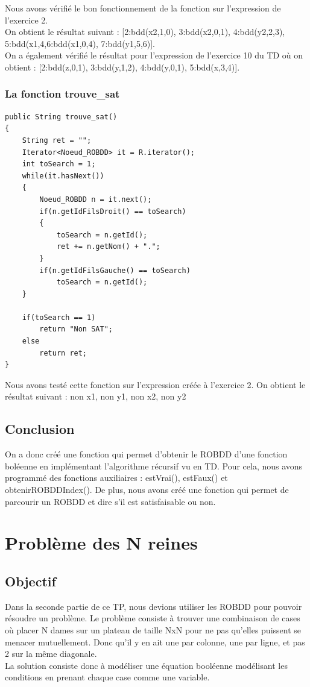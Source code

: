 \documentclass{article}
\begin{document}
Nous avons vérifié le bon fonctionnement de la fonction sur l'expression de l'exercice 2.\\
On obtient le résultat suivant : [2:bdd(x2,1,0), 3:bdd(x2,0,1), 4:bdd(y2,2,3), 5:bdd(x1,4,6:bdd(x1,0,4), 7:bdd(y1,5,6)].\\
On a également vérifié le résultat pour l'expression de l'exercice 10 du TD où on obtient : [2:bdd(z,0,1), 3:bdd(y,1,2), 4:bdd(y,0,1), 5:bdd(x,3,4)].\\
\subsubsection{La fonction trouve\_sat}
\begin{verbatim}
public String trouve_sat()
{
	String ret = "";
	Iterator<Noeud_ROBDD> it = R.iterator();
	int toSearch = 1;
	while(it.hasNext())
	{
		Noeud_ROBDD n = it.next();
		if(n.getIdFilsDroit() == toSearch)
		{
			toSearch = n.getId();
			ret += n.getNom() + ".";
		}
		if(n.getIdFilsGauche() == toSearch)
			toSearch = n.getId();
	}
	
	if(toSearch == 1)
		return "Non SAT";
	else
		return ret;
}
\end{verbatim}
Nous avons testé cette fonction sur l'expression créée à l'exercice 2.
On obtient le résultat suivant : non x1, non y1, non x2, non y2
\subsection{Conclusion}
On a donc créé une fonction qui permet d'obtenir le ROBDD d'une fonction boléenne en implémentant l'algorithme récursif vu en TD. Pour cela, nous avons programmé des fonctions auxiliaires : estVrai(), estFaux() et obtenirROBDDIndex(). De plus, nous avons créé une fonction qui permet de parcourir un ROBDD et dire s'il est satisfaisable ou non.
\section{Problème des N reines}
\subsection{Objectif}
Dans la seconde partie de ce TP, nous devions utiliser les ROBDD pour pouvoir résoudre un problème. Le problème consiste à trouver une combinaison de cases où placer N dames sur un plateau de taille NxN pour ne pas qu'elles puissent se menacer mutuellement. Donc qu'il y en ait une par colonne, une par ligne, et pas 2 sur la même diagonale.\\
La solution consiste donc à modéliser une équation booléenne modélisant les conditions en prenant chaque case comme une variable.
\end{document}
